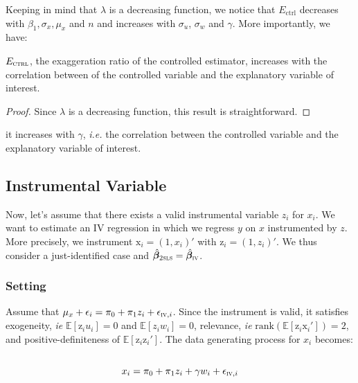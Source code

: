 \documentclass[a4paper, 11pt]{report}
\begin{document}
			Keeping in mind that $\lambda$ is a decreasing function, we notice that $E_\text{ctrl}$ decreases with $\beta_{1}, \sigma_{x}, \mu_{x}$ and $n$ and increases with $\sigma_{u}$, $\sigma_{w}$ and $\gamma$. More importantly, we have:
			~	
			\begin{proposition}
					 $E_{\textsc{ctrl}}$, the exaggeration ratio of the controlled estimator, increases with the correlation between of the controlled variable and the explanatory variable of interest.
				\end{proposition}
				
				\begin{proof}
					Since $\lambda$ is a decreasing function, this result is straightforward.
				\end{proof}
			 it increases with $\gamma$, \textit{i.e.} the correlation between the controlled variable and the explanatory variable of interest. 

				
		
		\subsection{Instrumental Variable}
		
			Now, let's assume that there exists a valid instrumental variable $z_i$ for $x_i$. We want to estimate an IV regression in which we regress $y$ on $x$ instrumented by $z$. More precisely, we instrument $\text{x}_{i} = (1, x_{i})'$ with $\text{z}_{i} = (1, z_{i})'$. We thus consider a just-identified case and $\hat{\bm{\beta}}_{\textsc{2sls}} = \hat{\bm{\beta}}_{\textsc{iv}}$. 
		
			\subsubsection{Setting}
		
				Assume that $\mu_x + \epsilon_{i} = \pi_0 + \pi_1 z_i + \epsilon_{\textsc{iv}, i}$. Since the instrument is valid, it satisfies exogeneity, \textit{ie} $\mathbb{E}[\text{z}_{i}u_{i}] = 0$ and  $\mathbb{E}[z_{i}w_{i}] = 0$, relevance, \textit{ie} $\text{rank}(\mathbb{E}[\text{z}_{i}\text{x}_i']) = 2$,  and positive-definiteness of $\mathbb{E}[\text{z}_i \text{z}_i']$. The data generating process for $x_i$ becomes:			
				~
				\begin{equation}\label{maths_dgp_x_iv}
					x_i = \pi_0 + \pi_1 z_i + \gamma w_{i} + \epsilon_{\textsc{iv}, i}
				\end{equation}
				
\end{document}
